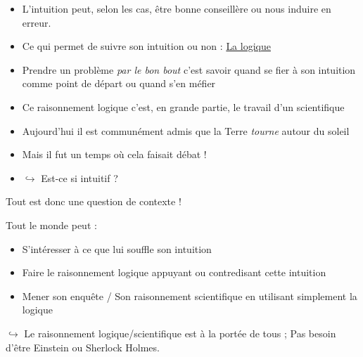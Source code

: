 \documentclass[usenames, dvipsnames, no-framenumber]{beamer}
\begin{document}
\begin{frame}%
\begin{itemize}
\item L'intuition peut, selon les cas, être bonne conseillère ou nous induire en erreur. \pause
\item Ce qui permet de suivre son intuition ou non : \underline{La logique} \pause 
\item Prendre un problème \textit{par le bon bout} c'est savoir quand se fier à son intuition comme point de départ ou quand s'en méfier \pause 
\item Ce raisonnement logique c'est, en grande partie, le travail d'un scientifique
\end{itemize}



\end{frame}




\begin{frame}%

\begin{itemize}
\item Aujourd'hui il est communément admis que la Terre \textit{tourne} autour du soleil \pause
\item Mais il fut un temps où cela faisait débat ! \pause
\item $\hookrightarrow$ Est-ce si intuitif ? \pause 
\end{itemize}


\vspace{2cm} Tout est donc une question de contexte ! 
\end{frame}



\begin{frame}%
Tout le monde peut : 
\begin{itemize}
\item S'intéresser à ce que lui souffle son intuition \pause
\item Faire le raisonnement logique appuyant ou contredisant cette intuition \pause 
\item Mener son enquête / Son raisonnement scientifique en utilisant simplement la logique
\end{itemize}
\pause $\hookrightarrow$ Le raisonnement logique/scientifique est à la portée de tous ; Pas besoin d'être Einstein ou Sherlock Holmes.
\end{frame} 
\end{document}
